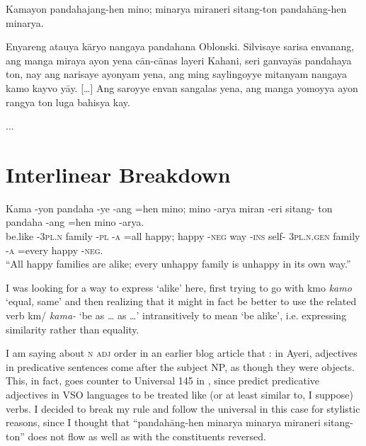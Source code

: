 \documentclass[12pt,paper=letter]{scrartcl}
\newcommand{\fw}[1]{\textit{#1}} %
\newcommand{\q}[1]{\enquote{#1}} %
\newcommand{\qq}[1]{\enquote*{#1}} %
\newcommand{\mor}[1]{\textsc{\lowercase{#1}}}
\newcommand{\ayr}[1]{{\Tagati #1}}
\begin{document}
\noindent Kamayon pandahajang-hen mino; minarya miraneri sitang-ton 
pandahāng-hen minarya.

Enyareng atauya kāryo nangaya pandahana Oblonski. Silvisaye sarisa envanang, 
ang manga miraya ayon yena cān-cānas layeri Kahani, seri ganvayās pandahaya ton, 
nay ang narisaye ayonyam yena, ang ming saylingoyye mitanyam nangaya kamo kayvo 
yāy. […] Ang saroyye envan sangalas yena, ang manga yomoyya ayon rangya ton 
luga bahisya kay.

...

\section{Interlinear Breakdown}

\begin{exe}
    \ex \label{ex:1}
    \gll Kama -yon pandaha -ye -ang =hen mino; mino -arya miran -eri sitang- ton 
	pandaha -ang =hen mino -arya. \\
    be.like \mor{-3PL.N} family \mor{-PL} \mor{-A} =all happy; happy \mor{-NEG} 
	way \mor{-INS} self- \mor{3PL.N.GEN} family \mor{-A} =every happy
	\mor{-NEG}. \\
    \glt \q{All happy families are alike; every unhappy family is unhappy 
	in its own way.}
\end{exe}

I was looking for a way to express \qq{alike} here, first trying to go with
\ayr{kmo} \fw{kamo} \qq{equal, same} and then realizing that it might in fact
be better to use the related verb \ayr{km/} \fw{kama-} \qq{be as … as …}
intransitively to mean \qq{be alike}, i.e. expressing similarity rather than 
equality.

I am saying about \mor{N ADJ} order in an earlier blog article that 
: in Ayeri, adjectives in predicative sentences come after
the subject NP, as though they were objects. This, in fact, goes counter to 
Universal 145 in  \autocite{universalsarchive},
since \citeauthor{universalsarchive} predict predicative adjectives in VSO 
languages to be treated like (or at least similar to, I suppose) verbs. I 
decided to break my rule and follow the universal in this case for stylistic 
reasons, since I thought that \q{pandahāng-hen minarya minarya miraneri 
sitang-ton} does not flow as well as with the constituents reversed.
\end{document}
